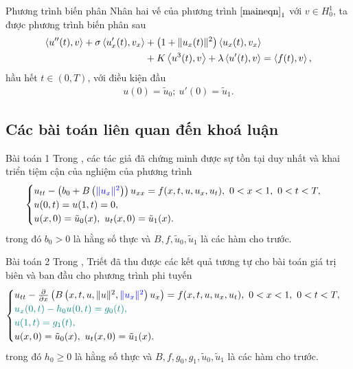 \documentclass[9pt]{beamer}
\begin{document}
\begin{frame}
    \begin{block}{Phương trình biến phân}
    Nhân hai vế của phương trình $\eqref{maineqn}_1$ với $v \in H^1_0$, ta được phương trình biến phân sau
    \begin{align} \label{vareqn}
        \left< u''(t), v \right>
        + \sigma \left< u'_x(t), v_x \right>
        &+ \left(1 + \|u_x(t)\|^2\right) \left< u_x(t), v_x \right> \\
        &+ K \left< u^3(t), v \right> + \lambda \left< u'(t), v \right>
        = \left< f(t), v \right>, \notag
    \end{align}
    hầu hết $t \in (0,T)$, với điều kiện đầu
    \begin{align}
        u(0) = \tilde{u}_0;\ u'(0) = \tilde{u}_1.
    \end{align}
    \end{block}
\end{frame}

\subsection{Các bài toán liên quan đến khoá luận}

\begin{frame}
    \begin{block}{Bài toán 1}
    Trong \cite{4}, các tác giả đã chứng minh được sự tồn tại duy nhất và khai triển tiệm cận của nghiệm của phương trình
    \begin{align*}
    \begin{cases}
        u_{tt} - \left(b_0 + B\left(\textcolor{blue}{\|u_x\|^2}\right)\right) u_{xx} = f(x,t,u,u_x,u_t),\ 0 < x < 1,\ 0 < t < T, \\
        u(0,t) = u(1,t) = 0, \\
        u(x,0) = \tilde{u}_0(x),\ u_t(x,0) = \tilde{u}_1(x).
    \end{cases}
    \end{align*}
    trong đó $b_0 > 0$ là hằng số thực và $B, f, \tilde{u}_0, \tilde{u}_1$ là các hàm cho trước.
    \end{block}

    \begin{block}{Bài toán 2}
    Trong \cite{6}, Triết đã thu được các kết quả tương tự cho bài toán giá trị biên và ban đầu cho phương trình phi tuyến
    \begin{align*}
    \begin{cases}
        u_{tt} - \frac{\partial}{\partial x} \left(B\left(x,t,u, \|u\|^2, \textcolor{blue}{\|u_x\|^2}\right) u_x\right) = f(x,t,u,u_x,u_t), \ 0 < x < 1,\ 0 < t < T, \\
        \textcolor{teal}{u_x(0,t) - h_0 u(0,t) = g_0(t),} \\
        \textcolor{teal}{u(1,t) = g_1(t),} \\
        u(x,0) = \tilde{u}_0(x),\ u_t(x,0) = \tilde{u}_1(x).
    \end{cases}
    \end{align*}
    trong đó $h_0 \ge 0$ là hằng số thực và $B, f, g_0, g_1, \tilde{u}_0, \tilde{u}_1$ là các hàm cho trước.
    \end{block}
\end{frame}
\end{document}
